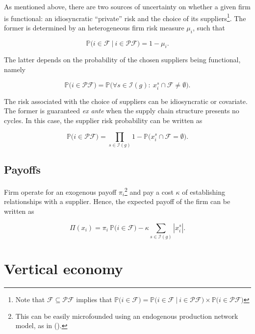 \documentclass[american, abstract=on]{scrartcl}
\newcommand{\F}{\mathcal{F}}
\newcommand{\I}{\mathcal{I}}
\newcommand{\PF}{\mathcal{P} \F}
\renewcommand{\P}{\mathbb{P}}
\newcommand{\abs}[1]{\left\lvert#1\right\rvert}
\newcommand{\citein}[1]{\citeauthor{#1} (\citeyear{#1})}
\begin{document}
As mentioned above, there are two sources of uncertainty on whether a given firm is functional: an idiosyncratic ``private'' risk and the choice of its suppliers\footnote{Note that $\F \subseteq \PF$ implies that $\P\Big(i \in \F \Big) = \P\Big(i \in \F \ \vert \ i \in \PF \Big) \times \P\Big( i \in \PF \Big)$}. The former is determined by an heterogeneous firm risk measure $\mu_i$, such that  

\begin{equation}
  \P\Big(i \in \F \ \vert \ i \in \PF \Big) = 1 - \mu_i.
\end{equation}

The latter depends on the probability of the chosen suppliers being functional, namely

\begin{equation}
  \P\Big( i \in \PF \Big) = \P\Big( \forall s \in \I(g): \ x_i^s \cap \F \neq \emptyset \Big).
\end{equation}

The risk associated with the choice of suppliers can be idiosyncratic or covariate. The former is guaranteed \textit{ex ante} when the supply chain structure presents no cycles. In this case, the supplier risk probability can be written as 

\begin{equation}
  \P\Big( i \in \PF \Big) = \prod_{s \in \I(g)} 1 - \P\Big( x^s_i \cap \F = \emptyset\Big).
\end{equation}

\subsection{Payoffs}

Firm operate for an exogenous payoff $\pi_i$\footnote{This can be easily microfounded using an endogenous production network model, as in \citein{acemoglu_endogenous_2020}.} and pay a cost $\kappa$ of establishing relationships with a supplier. Hence, the expected payoff of the firm can be written as

\begin{equation}
  \Pi(x_i) = \pi_i \ \P\Big( i \in \F \Big) - \kappa \sum_{s \in \I(g)} \abs{x^s_i}.
\end{equation}

\section{Vertical economy} \label{sec:vertical}
\end{document}

